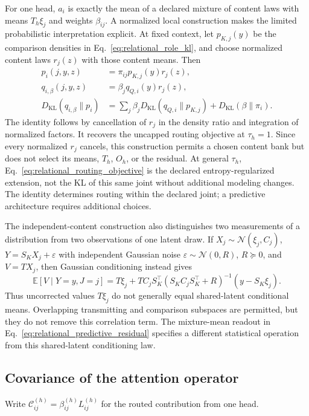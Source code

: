 \documentclass[twoside,11pt]{article}
\begin{document}
For one head, $a_i$ is exactly the mean of a declared mixture of content laws with means $T_h\xi_j$ and weights $\beta_{ij}$. A normalized local construction makes the limited probabilistic interpretation explicit. At fixed context, let $p_{K,j}(y)$ be the comparison densities in Eq.~\eqref{eq:relational_role_kl}, and choose normalized content laws $r_j(z)$ with those content means. Then
\begin{align}
p_i(j,y,z)&=\pi_{ij}p_{K,j}(y)r_j(z),\\
q_{i,\beta}(j,y,z)&=\beta_jq_{Q,i}(y)r_j(z),\\
D_{\mathrm{KL}}(q_{i,\beta}\|p_i)
&=\sum_j\beta_jD_{\mathrm{KL}}(q_{Q,i}\|p_{K,j})
+D_{\mathrm{KL}}(\beta\|\pi_i).
\label{eq:relational_normalized_model}
\end{align}
The identity follows by cancellation of $r_j$ in the density ratio and integration of normalized factors. It recovers the uncapped routing objective at $\tau_h=1$. Since every normalized $r_j$ cancels, this construction permits a chosen content bank but does not select its means, $T_h$, $O_h$, or the residual. At general $\tau_h$, Eq.~\eqref{eq:relational_routing_objective} is the declared entropy-regularized extension, not the KL of this same joint without additional modeling changes. The identity determines routing within the declared joint; a predictive architecture requires additional choices.

The independent-content construction also distinguishes two measurements of a distribution from two observations of one latent draw. If $X_j\sim\mathcal N(\xi_j,C_j)$, $Y=S_KX_j+\varepsilon$ with independent Gaussian noise $\varepsilon\sim\mathcal N(0,R)$, $R\succeq0$, and $V=T X_j$, then Gaussian conditioning instead gives \citep{petersen2012matrix}
\begin{equation}
\mathbb E[V\mid Y=y,J=j]
=T\xi_j+TC_jS_K^\top(S_KC_jS_K^\top+R)^{-1}(y-S_K\xi_j).
\label{eq:relational_shared_latent_correction}
\end{equation}
Thus uncorrected values $T\xi_j$ do not generally equal shared-latent conditional means. Overlapping transmitting and comparison subspaces are permitted, but they do not remove this correlation term. The mixture-mean readout in Eq.~\eqref{eq:relational_predictive_residual} specifies a different statistical operation from this shared-latent conditioning law.

\subsection{Covariance of the attention operator}
Write $\mathcal C_{ij}^{(h)}=\beta_{ij}^{(h)}L_{ij}^{(h)}$ for the routed contribution from one head.
\end{document}
